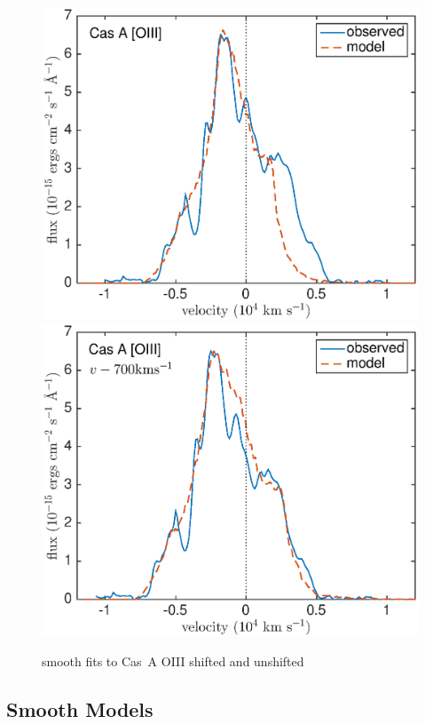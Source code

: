 \begin{figure}
\centering
\includegraphics[scale=0.43,clip=true, trim=30 0 50 20]{chapters/chapter6/figs/CasA/CasA_OIII}
\includegraphics[scale=0.43,clip=true, trim=30 0 50 20]{chapters/chapter6/figs/CasA/CasA_shifted_OIII}
\caption{smooth fits to Cas~A OIII shifted and unshifted}
\label{CasA_OIII}
\end{figure}


\subsection{Smooth Models}

